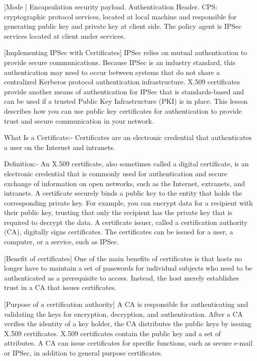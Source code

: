 \documentclass[conference, compsoc]{IEEEtran}
\begin{document}
	[Mode ]
Encapsulation security payload.
Authentication Header.
CPS: cryptographic protocol services, located at local machine and responsible for generating public key and private key at client side.
The policy agent is IPSec services located at client under services.

	[Implementing IPSec with Certificates]
IPSec relies on mutual authentication to provide secure communications. Because IPSec is an industry standard, this authentication may need to occur between systems that do not share a centralized Kerberos protocol authentication infrastructure. X.509 certificates provide another means of authentication for IPSec that is standards-based and can be used if a trusted Public Key Infrastructure (PKI) is in place. This lesson describes how you can use public key certificates for authentication to provide trust and secure communication in your network.


What Is a Certificate:- 
Certificates are an electronic credential that authenticates a user on the Internet and intranets.

Definition:-
An X.509 certificate, also sometimes called a digital certificate, is an electronic credential that is commonly used for authentication and secure exchange of information on open networks, such as the Internet, extranets, and intranets.
A certificate securely binds a public key to the entity that holds the corresponding private key. For example, you can encrypt data for a recipient with their public key, trusting that only the recipient has the private key that is required to decrypt the data.
A certificate issuer, called a certification authority (CA), digitally signs certificates. The certificates can be issued for a user, a computer, or a service, such as IPSec.

	[Benefit of certificates]
One of the main benefits of certificates is that hosts no longer have to maintain a set of passwords for individual subjects who need to be authenticated as a prerequisite to access. Instead, the host merely establishes trust in a CA that issues certificates.


	[Purpose of a certification authority]
A CA is responsible for authenticating and validating the keys for encryption, decryption, and authentication. After a CA verifies the identity of a key holder, the CA distributes the public keys by issuing X.509 certificates. X.509 certificates contain the public key and a set of attributes. A CA can issue certificates for specific functions, such as secure e-mail or IPSec, in addition to general purpose certificates.
\end{document}
